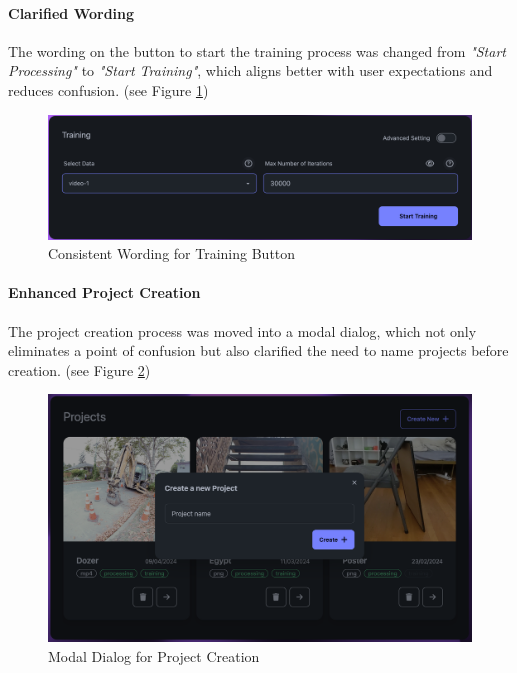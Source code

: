 \paragraph{Clarified Wording}
The wording on the button to start the training process was changed from \emph{"Start Processing"} to \emph{"Start Training"}, which aligns better with user expectations and reduces confusion. (see Figure \ref{fig:fix-2})

\begin{figure}[htb]
	\includegraphics[width=\textwidth]{figures/fix-2.png}
	\caption{Consistent Wording for Training Button}
  \label{fig:fix-2}
\end{figure}

\paragraph{Enhanced Project Creation}
The project creation process was moved into a modal dialog, which not only eliminates a point of confusion but also clarified the need to name projects before creation. (see Figure \ref{fig:fix-3})

\begin{figure}[htb]
	\includegraphics[width=\textwidth]{figures/fix-3.png}
	\caption{Modal Dialog for Project Creation}
  \label{fig:fix-3}
\end{figure}

